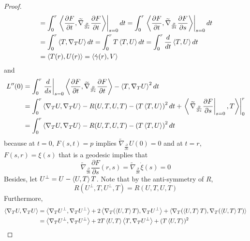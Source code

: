 \begin{enumerate}[label=\arabic{*}.]
\begin{proof}
\begin{equation*}
\begin{aligned}
				&= \int_0^r \left.\left\langle \frac{\partial F}{\partial t},\widetilde{\nabla}_{\frac{\partial}{\partial s}}\frac{\partial F}{\partial t} \right\rangle\right\lvert_{s=0} dt = \int_0^r \left.\left\langle \frac{\partial F}{\partial t},\widetilde{\nabla}_{\frac{\partial}{\partial t}}\frac{\partial F}{\partial s} \right\rangle\right\lvert_{s=0} dt \\
				&= \int_0^r \left\langle T,\nabla_TU \right\rangle dt = \int_0^r T\left\langle T,U \right\rangle dt= \int_0^r \frac{d}{dt} \left\langle T,U \right\rangle dt \\
				&= \left\langle T(r),U(r) \right\rangle = \left\langle \dot{\gamma}(r),V \right\rangle
			\end{aligned}
		\end{equation*}
		and
		\begin{equation*}
			\begin{aligned}
				L^{\prime\prime}(0) &= \int_0^r \left.\frac{d}{ds}\right\lvert_{s=0}\left\langle \frac{\partial F}{\partial t},\widetilde{\nabla}_{\frac{\partial}{\partial s}}\frac{\partial F}{\partial t} \right\rangle - \left\langle T,\nabla_TU \right\rangle^2 dt \\
				&= \int_0^r \left\langle \nabla_TU,\nabla_TU \right\rangle - R(U,T,U,T)  - \left(T\left\langle T,U \right\rangle\right)^2dt + \left.\left\langle \left.\widetilde{\nabla}_{\frac{\partial}{\partial s}} \frac{\partial F}{\partial s}\right\lvert_{s=0}, T\right\rangle\right|_ 0^r \\
				&= \int_0^r \left\langle \nabla_TU,\nabla_TU \right\rangle - R(U,T,U,T)  - \left(T\left\langle T,U \right\rangle\right)^2dt
			\end{aligned}
		\end{equation*}
		because at $t = 0$, $F(s,t) = p$ implies $\widetilde{\nabla}_{\frac{\partial}{\partial s}} U(0) = 0$ and at $t=r$, $F(s,r) =\xi(s)$ that is a geodesic implies that
		\begin{equation*}
			\widetilde{\nabla}_{\frac{\partial}{\partial s}} \frac{\partial F}{\partial s}(r,s) = \widetilde{\nabla}_{\frac{\partial}{\partial s}} \dot{\xi}(s) = 0
		\end{equation*}
		Besides, let $U^\perp = U - \left\langle U,T \right\rangle T$. Note that by the anti-symmetry of $R$,
		\begin{equation*}
			R(U^\perp,T,U^\perp,T) = R(U,T,U,T)
		\end{equation*}
		Furthermore,
		\begin{equation*}
			\begin{aligned}
				\inn{\nabla_TU,\nabla_TU} &= \inn{\nabla_TU^\perp,\nabla_TU^\perp} + 2 \inn{\nabla_T (\inn{U,T}T),\nabla_TU^\perp} + \inn{\nabla_T (\inn{U,T}T),\nabla_T (\inn{U,T}T)} \\
				&= \inn{\nabla_TU^\perp,\nabla_TU^\perp} + 2 T\inn{U,T}\inn{T,\nabla_TU^\perp} + (T\inn{U,T})^2 
			\end{aligned}

\end{equation*}
\end{proof}
\end{enumerate}
